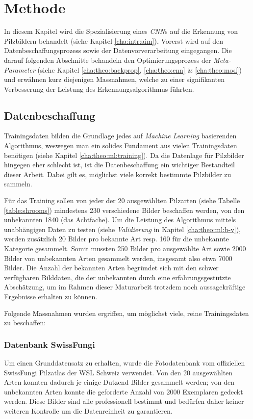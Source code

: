 \section{Methode}\label{cha:method}

In diesem Kapitel wird die Spezialisierung eines \textit{CNN}s auf die Erkennung von Pilzbildern behandelt (siehe Kapitel \ref{cha:intr:aim}). Vorerst wird auf den Datenbeschaffungsprozess sowie der Datenvorverarbeitung eingegangen. Die darauf folgenden Abschnitte behandeln den Optimierungsprozess der \textit{Meta-Parameter} (siehe Kapitel \ref{cha:theo:backprop}, \ref{cha:theo:cnn} \& \ref{cha:theo:mod}) und erwähnen kurz diejenigen Massnahmen, welche zu einer signifikanten Verbesserung der Leistung des Erkennungsalgorithmus führten.

\subsection{Datenbeschaffung} \label{cha:met:datagathering}
Trainingsdaten bilden die Grundlage jedes auf \textit{Machine Learning} basierenden Algorithmus, weswegen man ein solides Fundament aus vielen Trainingsdaten benötigen (siehe Kapitel \ref{cha:theo:ml:training}). Da die Datenlage für Pilzbilder hingegen eher schlecht ist, ist die Datenbeschaffung ein wichtiger Bestandteil dieser Arbeit. Dabei gilt es, möglichst viele korrekt bestimmte Pilzbilder zu sammeln.

Für das Training sollen von jeder der 20 ausgewählten Pilzarten (siehe Tabelle \ref{table:shrooms}) mindestens 230 verschiedene Bilder beschaffen werden, von den unbekannten 1840 (das Achtfache). Um die Leistung des Algorithmus mittels unabhängigen Daten zu testen (siehe \textit{Validierung} in Kapitel \ref{cha:theo:ml:b-v}), werden zusätzlich 20 Bilder pro bekannte Art resp. 160 für die unbekannte Kategorie gesammelt. Somit mussten 250 Bilder pro ausgewählte Art sowie 2000 Bilder von unbekannten Arten gesammelt werden, insgesamt also etwa 7000 Bilder. Die Anzahl der bekannten Arten begründet sich mit den schwer verfügbaren Bilddaten, die der unbekannten durch eine erfahrungsgestützte Abschätzung, um im Rahmen dieser Maturarbeit trotzdem noch aussagekräftige Ergebnisse erhalten zu können.

Folgende Massnahmen wurden ergriffen, um möglichst viele, reine Trainingsdaten zu beschaffen:

\subsubsection{Datenbank SwissFungi}
Um einen Grunddatensatz zu erhalten, wurde die Fotodatenbank vom offiziellen SwissFungi Pilzatlas der WSL Schweiz verwendet\cite{wsl}. Von den 20 ausgewählten Arten konnten dadurch je einige Dutzend Bilder gesammelt werden; von den unbekannten Arten konnte die geforderte Anzahl von 2000 Exemplaren gedeckt werden. Diese Bilder sind alle professionell bestimmt und bedürfen daher keiner weiteren Kontrolle um die Datenreinheit zu garantieren. 

